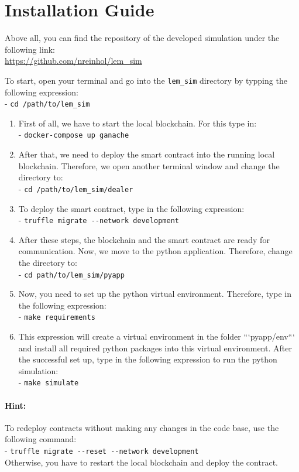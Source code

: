 \section{Installation Guide}

Above all, you can find the repository of the developed simulation under the following link: \\
\url{https://github.com/nreinhol/lem_sim}

\vspace{0.7cm}

To start, open your terminal and go into the \verb|lem_sim| directory by typping the following
expression: \\
- \verb|cd /path/to/lem_sim|



\begin{enumerate}
    \item First of all, we have to start the local blockchain. For this type in: \\
            - \verb|docker-compose up ganache|
    \item After that, we need to deploy the smart contract into the running local blockchain. Therefore, we open another terminal window and change the directory to: \\
            - \verb|cd /path/to/lem_sim/dealer|
    \item To deploy the smart contract, type in the following expression: \\
            - \verb|truffle migrate --network development|
    \item After these steps, the blockchain and the smart contract are ready for communication. 
    Now, we move to the python application. Therefore, change the directory to: \\
            - \verb|cd path/to/lem_sim/pyapp|
    \item Now, you need to set up the python virtual environment. Therefore, type in the following expression: \\
            - \verb|make requirements|
    \item This expression will create a virtual environment in the folder ```pyapp/env``` and install all required python packages into this virtual environment.
    After the successful set up, type in the following expression to run the python simulation: \\
            - \verb|make simulate|
\end{enumerate}

\paragraph{Hint:} To redeploy contracts without making any changes in the code base, use the following command: \\
- \verb|truffle migrate --reset --network development| \\
Otherwise, you have to restart the local blockchain and deploy the contract.

